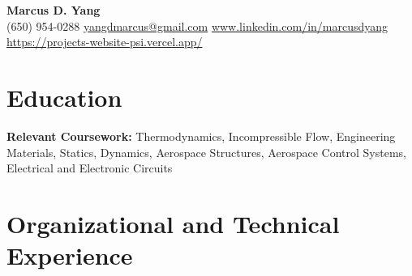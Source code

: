 \newcommand{\entrygap}{\vspace{2pt}}



\begin{center}
  {\fontsize{17}{20}\selectfont\bfseries Marcus D. Yang}\\[2pt]
  {\footnotesize (650) 954-0288 \textbar{} \href{mailto:yangdmarcus@gmail.com}{yangdmarcus@gmail.com} \textbar{} \href{https://www.linkedin.com/in/marcusdyang}{www.linkedin.com/in/marcusdyang} \textbar{} \href{https://projects-website-psi.vercel.app/}{https://projects-website-psi.vercel.app/}}
\end{center}

\section{Education}
\textbf{Relevant Coursework:} Thermodynamics, Incompressible Flow, Engineering Materials, Statics, Dynamics, Aerospace Structures, Aerospace Control Systems, Electrical and Electronic Circuits

\section{Organizational and Technical Experience}

